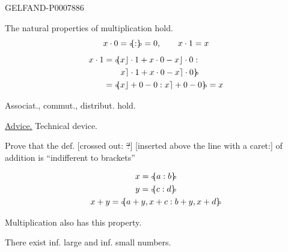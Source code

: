 \begin{GelfandAdjacentEvidence}{GELFAND-P000788}{6}


The natural properties of multiplication hold.
\[
x\cdot0=\mathopen{{\scriptstyle\circ}\mkern-5mu\{}:\mathclose{\}\mkern-5mu{\scriptstyle\circ}}=0,\qquad x\cdot1=x
\]
\[
\begin{aligned}
x\cdot1&=\mathopen{{\scriptstyle\circ}\mkern-5mu\{}x\rfloor\cdot1+x\cdot0-x\rfloor\cdot0:\\
&\qquad x\rceil\cdot1+x\cdot0-x\rceil\cdot0\mathclose{\}\mkern-5mu{\scriptstyle\circ}}\\
&=\mathopen{{\scriptstyle\circ}\mkern-5mu\{}x\rfloor+0-0:x\rceil+0-0\mathclose{\}\mkern-5mu{\scriptstyle\circ}}=x
\end{aligned}
\]

Associat., commut., distribut. hold.


\underline{\underline{Advice.}} Technical device.

Prove that the def. [crossed out: \sout{?}] [inserted above the line with a caret:] of addition is “indifferent to brackets”

\hfill{}

\end{GelfandAdjacentEvidence}


\begin{gather*}
x=\mathopen{{\scriptstyle\circ}\mkern-5mu\{}a:b\mathclose{\}\mkern-5mu{\scriptstyle\circ}}\\
y=\mathopen{{\scriptstyle\circ}\mkern-5mu\{}c:d\mathclose{\}\mkern-5mu{\scriptstyle\circ}}\\
x+y=\mathopen{{\scriptstyle\circ}\mkern-5mu\{}a+y,x+c:b+y,x+d\mathclose{\}\mkern-5mu{\scriptstyle\circ}}
\end{gather*}

Multiplication also has this property.


There exist inf. large and inf. small numbers.


